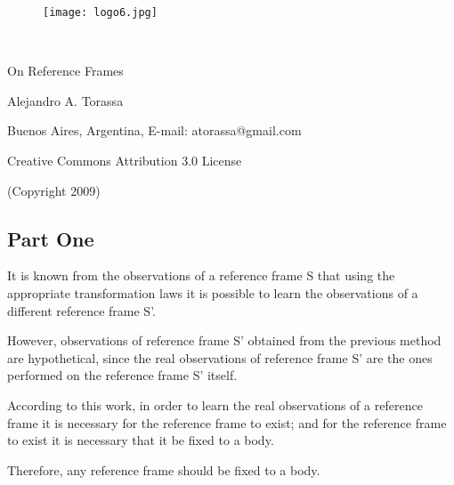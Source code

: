 \documentclass[11pt]{article}
\begin{document}
\begin{figure}
\texttt{[image: logo6.jpg]}
\end{figure}

\enlargethispage{0em}

\begin{center}

\ \vspace{-1.5em}

{\LARGE On Reference Frames}

\vspace{+1.8em}

\normalsize

Alejandro A. Torassa

\medskip

\footnotesize

Buenos Aires, Argentina, E-mail: atorassa@gmail.com

\medskip

Creative Commons Attribution 3.0 License

\medskip

(Copyright 2009)

\vspace{+1.2em}

\end{center}

\begin{abstract}

\noindent In this work it is established, on one hand, that any reference frame should be fixed to a body and, on the other hand, that it is possible to agree that any reference frame fixed to a body should be non-rotating.

\medskip

\noindent Keywords: classical mechanics, observer, body, center of mass, rotating reference frame, non-rotating reference frame.

\vspace{+0.3em}

\end{abstract}

\normalsize

{\centering\subsection*{Part One}}

\par It is known from the observations of a reference frame S that using the appropriate transformation laws it is possible to learn the observations of a different reference frame S'.
\medskip
\par However, observations of reference frame S' obtained from the previous method are hypothetical, since the real observations of reference frame S' are the ones performed on the reference frame S' itself.
\medskip
\par According to this work, in order to learn the real observations of a reference frame it is necessary for the reference frame to exist; and for the reference frame to exist it is necessary that it be fixed to a body.
\medskip
\par Therefore, any reference frame should be fixed to a body.
\end{document}
